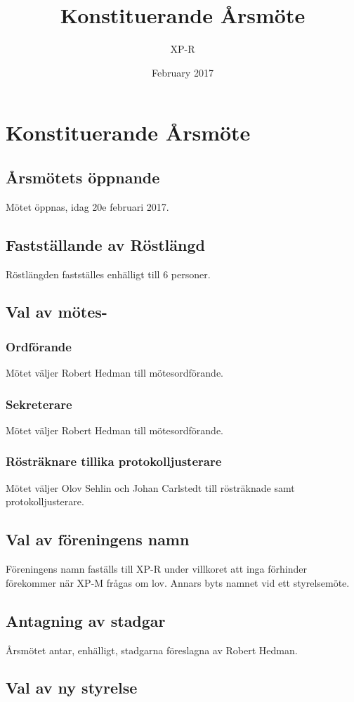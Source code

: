 \documentclass{article}
\title{Konstituerande Årsmöte}
\author{XP-R}
\date{February 2017}
\begin{document}
\maketitle

\section{Konstituerande Årsmöte}

\subsection{Årsmötets öppnande}
Mötet öppnas, idag 20e februari 2017.
\subsection{Fastställande av Röstlängd}
Röstlängden fastställes enhälligt till 6 personer.
\subsection{Val av mötes-}
\subsubsection{Ordförande}
Mötet väljer Robert Hedman till mötesordförande.
\subsubsection{Sekreterare}
Mötet väljer Robert Hedman till mötesordförande.
\subsubsection{Rösträknare tillika protokolljusterare}
Mötet väljer Olov Sehlin och Johan Carlstedt till rösträknade samt protokolljusterare.
\subsection{Val av föreningens namn}
Föreningens namn faställs till XP-R under villkoret att inga förhinder förekommer när XP-M frågas om lov. Annars byts namnet vid ett styrelsemöte.
\subsection{Antagning av stadgar}
Årsmötet antar, enhälligt, stadgarna föreslagna av Robert Hedman.
\subsection{Val av ny styrelse}
\end{document}
